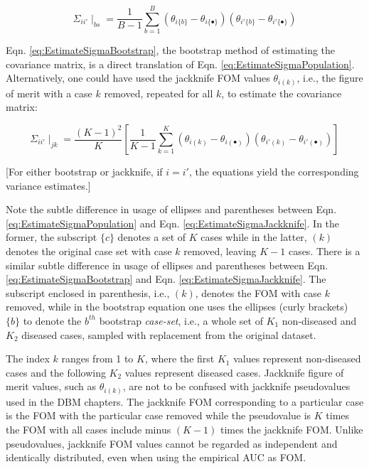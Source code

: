 \documentclass[
]{book}
\begin{document}
\begin{equation}
\Sigma_{ii'}\mid_{bs} =\frac{1}{B-1}\sum_{b=1}^{B} \left ( \theta_{i\{b\}} - \theta_{i\{\bullet\}} \right) \left ( \theta_{i'\{b\}} - \theta_{i'\{\bullet\}} \right)
\label{eq:EstimateSigmaBootstrap}
\end{equation}

Eqn. \eqref{eq:EstimateSigmaBootstrap}, the bootstrap method of estimating the covariance matrix, is a direct translation of Eqn. \eqref{eq:EstimateSigmaPopulation}. Alternatively, one could have used the jackknife FOM values \(\theta_{i(k)}\), i.e., the figure of merit with a case \(k\) removed, repeated for all \(k\), to estimate the covariance matrix:

\begin{equation}
\Sigma_{ii'}\mid_{jk} =\frac{(K-1)^2}{K} \left [ \frac{1}{K-1}\sum_{k=1}^{K} \left ( \theta_{i(k)} - \theta_{i(\bullet)} \right) \left ( \theta_{i'(k)} - \theta_{i'(\bullet)} \right) \right ]
\label{eq:EstimateSigmaJackknife}
\end{equation}

{[}For either bootstrap or jackknife, if \(i = i'\), the equations yield the corresponding variance estimates.{]}

Note the subtle difference in usage of ellipses and parentheses between Eqn. \eqref{eq:EstimateSigmaPopulation} and Eqn. \eqref{eq:EstimateSigmaJackknife}. In the former, the subscript \(\{c\}\) denotes a set of \(K\) cases while in the latter, \((k)\) denotes the original case set with case \(k\) removed, leaving \(K-1\) cases. There is a similar subtle difference in usage of ellipses and parentheses between Eqn. \eqref{eq:EstimateSigmaBootstrap} and Eqn. \eqref{eq:EstimateSigmaJackknife}. The subscript enclosed in parenthesis, i.e., \((k)\), denotes the FOM with case \(k\) removed, while in the bootstrap equation one uses the ellipses (curly brackets) \(\{b\}\) to denote the \(b^{th}\) bootstrap \emph{case-set}, i.e., a whole set of \(K_1\) non-diseased and \(K_2\) diseased cases, sampled with replacement from the original dataset.

The index \(k\) ranges from 1 to \(K\), where the first \(K_1\) values represent non-diseased cases and the following \(K_2\) values represent diseased cases. Jackknife figure of merit values, such as \(\theta_{i(k)}\), are not to be confused with jackknife pseudovalues used in the DBM chapters. The jackknife FOM corresponding to a particular case is the FOM with the particular case removed while the pseudovalue is \(K\) times the FOM with all cases include minus \((K-1)\) times the jackknife FOM. Unlike pseudovalues, jackknife FOM values cannot be regarded as independent and identically distributed, even when using the empirical AUC as FOM.
\end{document}

